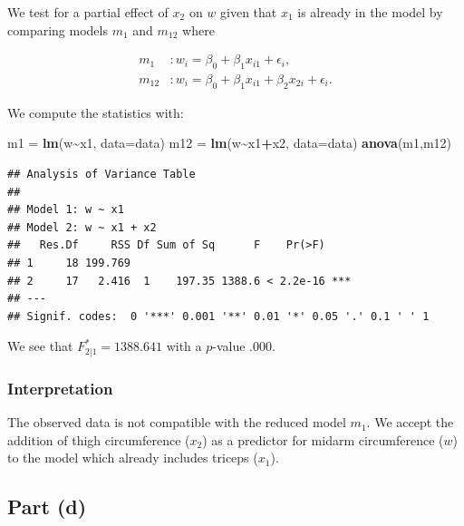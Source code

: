 \documentclass[
]{article}
\newenvironment{Shaded}{\begin{snugshade}}{\end{snugshade}}
\newcommand{\AttributeTok}[1]{\textcolor[rgb]{0.13,0.29,0.53}{#1}}
\newcommand{\FunctionTok}[1]{\textcolor[rgb]{0.13,0.29,0.53}{\textbf{#1}}}
\newcommand{\NormalTok}[1]{#1}
\newcommand{\OtherTok}[1]{\textcolor[rgb]{0.56,0.35,0.01}{#1}}
\newcommand{\SpecialCharTok}[1]{\textcolor[rgb]{0.81,0.36,0.00}{\textbf{#1}}}
\begin{document}
We test for a partial effect of \(x_2\) on \(w\) given that \(x_1\) is
already in the model by comparing models \(m_1\) and \(m_{1 2}\) where

\begin{align*}
  m_1     &: w_i = \beta_0 + \beta_1 x_{i 1} + \epsilon_i,\\
  m_{1 2} &: w_i = \beta_0 + \beta_1 x_{i 1} + \beta_2 x_{2 i} + \epsilon_i.
\end{align*}

We compute the statistics with:

\begin{Shaded}
\begin{Highlighting}[]
\NormalTok{m1 }\OtherTok{=} \FunctionTok{lm}\NormalTok{(w}\SpecialCharTok{\textasciitilde{}}\NormalTok{x1, }\AttributeTok{data=}\NormalTok{data)}
\NormalTok{m12 }\OtherTok{=} \FunctionTok{lm}\NormalTok{(w}\SpecialCharTok{\textasciitilde{}}\NormalTok{x1}\SpecialCharTok{+}\NormalTok{x2, }\AttributeTok{data=}\NormalTok{data)}
\FunctionTok{anova}\NormalTok{(m1,m12)}
\end{Highlighting}
\end{Shaded}

\begin{verbatim}
## Analysis of Variance Table
## 
## Model 1: w ~ x1
## Model 2: w ~ x1 + x2
##   Res.Df     RSS Df Sum of Sq      F    Pr(>F)    
## 1     18 199.769                                  
## 2     17   2.416  1    197.35 1388.6 < 2.2e-16 ***
## ---
## Signif. codes:  0 '***' 0.001 '**' 0.01 '*' 0.05 '.' 0.1 ' ' 1
\end{verbatim}

We see that \(F^*_{2|1} = 1388.641\) with a \(p\)-value \(.000\).

\hypertarget{interpretation-1}{%
\subsubsection{Interpretation}\label{interpretation-1}}

The observed data is not compatible with the reduced model \(m_1\). We
accept the addition of thigh circumference (\(x_2\)) as a predictor for
midarm circumference (\(w\)) to the model which already includes triceps
(\(x_1\)).

\hypertarget{part-d}{%
\subsection{Part (d)}\label{part-d}}
\end{document}
